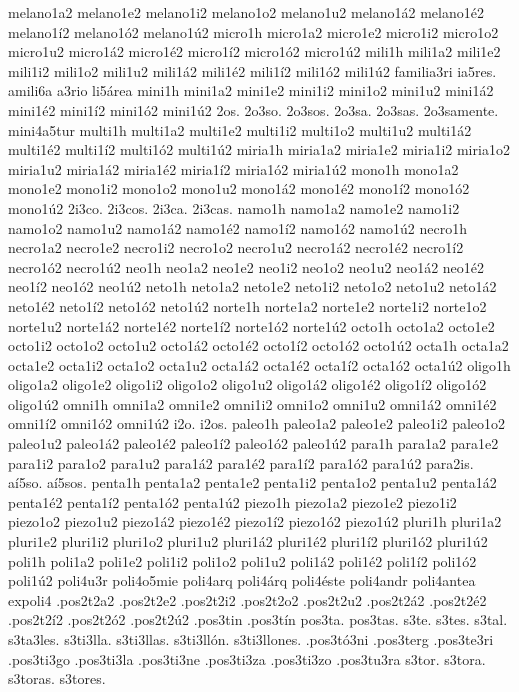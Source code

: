 {melano1a2 melano1e2 melano1i2 melano1o2 melano1u2
melano1á2 melano1é2 melano1í2 melano1ó2 melano1ú2
micro1h
micro1a2 micro1e2 micro1i2 micro1o2 micro1u2
micro1á2 micro1é2 micro1í2 micro1ó2 micro1ú2
mili1h
mili1a2 mili1e2 mili1i2 mili1o2 mili1u2
mili1á2 mili1é2 mili1í2 mili1ó2 mili1ú2
familia3ri
ia5res.
amili6a
a3rio
li5área
mini1h
mini1a2 mini1e2 mini1i2 mini1o2 mini1u2
mini1á2 mini1é2 mini1í2 mini1ó2 mini1ú2
2os.
2o3so.
2o3sos.
2o3sa.
2o3sas.
2o3samente.
mini4a5tur
multi1h
multi1a2 multi1e2 multi1i2 multi1o2 multi1u2
multi1á2 multi1é2 multi1í2 multi1ó2 multi1ú2
miria1h
miria1a2 miria1e2 miria1i2 miria1o2 miria1u2
miria1á2 miria1é2 miria1í2 miria1ó2 miria1ú2
mono1h
mono1a2 mono1e2 mono1i2 mono1o2 mono1u2
mono1á2 mono1é2 mono1í2 mono1ó2 mono1ú2
2i3co.
2i3cos.
2i3ca.
2i3cas.
namo1h
namo1a2 namo1e2 namo1i2 namo1o2 namo1u2
namo1á2 namo1é2 namo1í2 namo1ó2 namo1ú2
necro1h
necro1a2 necro1e2 necro1i2 necro1o2 necro1u2
necro1á2 necro1é2 necro1í2 necro1ó2 necro1ú2
neo1h
neo1a2 neo1e2 neo1i2 neo1o2 neo1u2
neo1á2 neo1é2 neo1í2 neo1ó2 neo1ú2
neto1h
neto1a2 neto1e2 neto1i2 neto1o2 neto1u2
neto1á2 neto1é2 neto1í2 neto1ó2 neto1ú2
norte1h
norte1a2 norte1e2 norte1i2 norte1o2 norte1u2
norte1á2 norte1é2 norte1í2 norte1ó2 norte1ú2
octo1h
octo1a2 octo1e2 octo1i2 octo1o2 octo1u2
octo1á2 octo1é2 octo1í2 octo1ó2 octo1ú2
octa1h
octa1a2 octa1e2 octa1i2 octa1o2 octa1u2
octa1á2 octa1é2 octa1í2 octa1ó2 octa1ú2
oligo1h
oligo1a2 oligo1e2 oligo1i2 oligo1o2 oligo1u2
oligo1á2 oligo1é2 oligo1í2 oligo1ó2 oligo1ú2
omni1h
omni1a2 omni1e2 omni1i2 omni1o2 omni1u2
omni1á2 omni1é2 omni1í2 omni1ó2 omni1ú2
i2o.
i2os.
paleo1h
paleo1a2 paleo1e2 paleo1i2 paleo1o2 paleo1u2
paleo1á2 paleo1é2 paleo1í2 paleo1ó2 paleo1ú2
para1h
para1a2 para1e2 para1i2 para1o2 para1u2
para1á2 para1é2 para1í2 para1ó2 para1ú2
para2is.
aí5so.
aí5sos.
penta1h
penta1a2 penta1e2 penta1i2 penta1o2 penta1u2
penta1á2 penta1é2 penta1í2 penta1ó2 penta1ú2
piezo1h
piezo1a2 piezo1e2 piezo1i2 piezo1o2 piezo1u2
piezo1á2 piezo1é2 piezo1í2 piezo1ó2 piezo1ú2
pluri1h
pluri1a2 pluri1e2 pluri1i2 pluri1o2 pluri1u2
pluri1á2 pluri1é2 pluri1í2 pluri1ó2 pluri1ú2
poli1h
poli1a2 poli1e2 poli1i2 poli1o2 poli1u2
poli1á2 poli1é2 poli1í2 poli1ó2 poli1ú2
poli4u3r
poli4o5mie
poli4arq
poli4árq
poli4éste
poli4andr
poli4antea
expoli4
.pos2t2a2
.pos2t2e2
.pos2t2i2
.pos2t2o2
.pos2t2u2
.pos2t2á2
.pos2t2é2
.pos2t2í2
.pos2t2ó2
.pos2t2ú2
.pos3tin
.pos3tín
pos3ta.
pos3tas.
s3te.
s3tes.
s3tal.
s3ta3les.
s3ti3lla.
s3ti3llas.
s3ti3llón.
s3ti3llones.
.pos3tó3ni
.pos3terg
.pos3te3ri
.pos3ti3go
.pos3ti3la
.pos3ti3ne
.pos3ti3za
.pos3ti3zo
.pos3tu3ra
s3tor.
s3tora.
s3toras.
s3tores.
}
